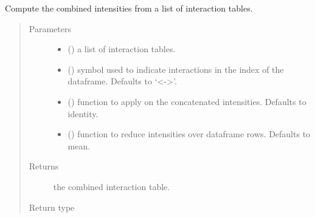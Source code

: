 \documentclass[letterpaper,10pt,english]{sphinxmanual}
\begin{document}
\begin{fulllineitems}
\label{\detokenize{_modules/cosifer.combiners:cosifer.combiners.cit.combine_tables}}
Compute the combined intensities from a list of interaction
tables.
\begin{quote}\begin{description}
\item[{Parameters}] \leavevmode\begin{itemize}
\item {} 
 () \textendash{} a list of interaction tables.

\item {} 
 (\sphinxstyleliteralemphasis{\sphinxupquote{, }}) \textendash{} symbol used to indicate
interactions in the index of the dataframe. Defaults to ‘\textless{}-\textgreater{}’.

\item {} 
 (\sphinxstyleliteralemphasis{\sphinxupquote{, }}) \textendash{} function
to apply on the concatenated intensities. Defaults to identity.

\item {} 
 (\sphinxstyleliteralemphasis{\sphinxupquote{, }}) \textendash{} function to reduce intensities over
dataframe rows. Defaults to mean.

\end{itemize}

\item[{Returns}] \leavevmode
the combined interaction table.

\item[{Return type}] \leavevmode
{\hyperref[\detokenize{_modules/cosifer.collections:cosifer.collections.interaction_table.InteractionTable}]{}}

\end{description}\end{quote}

\end{fulllineitems}
\end{document}
